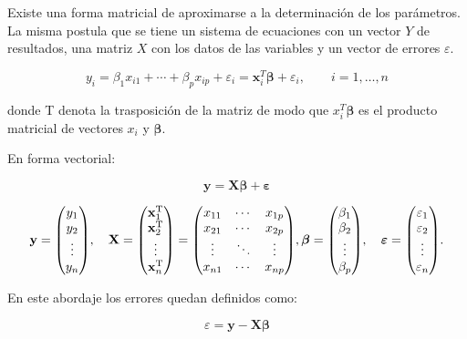 Existe una forma matricial de aproximarse a la determinación de los parámetros. La misma postula que se tiene un sistema de ecuaciones con un vector $Y$ de resultados, una matriz $X$ con los datos de las variables y un vector de errores $\varepsilon$. 

$$y_{i}=\beta _{1}x_{i1}+\cdots +\beta _{p}x_{ip}+\varepsilon _{i}=\mathbf {x} _{i}^{T}{\boldsymbol {\beta }}+\varepsilon _{i},\qquad i=1,\ldots,n$$

donde T denota la trasposición de la matriz de modo que ${x}_{i}^{T} \boldsymbol {\beta}$ es el producto matricial de vectores $x_i$ y $\boldsymbol {\beta }$.

En forma vectorial:

$$\mathbf {y} =\mathbf {X} {\boldsymbol {\beta }}+{\boldsymbol {\varepsilon }}$$


$$\mathbf {y} ={\begin{pmatrix}y_{1}\\y_{2}\\\vdots \\y_{n}\end{pmatrix}},\quad 
\mathbf {X} ={\begin{pmatrix}\mathbf {x} _{1}^{\rm {T}}\\\mathbf {x} _{2}^{\rm {T}}\\\vdots \\\mathbf {x} _{n}^{\rm {T}}\end{pmatrix}}={\begin{pmatrix}x_{11}&\cdots &x_{1p}\\x_{21}&\cdots &x_{2p}\\\vdots &\ddots &\vdots \\x_{n1}&\cdots &x_{np}\end{pmatrix}},
{\boldsymbol {\beta }}={\begin{pmatrix}\beta _{1}\\\beta _{2}\\\vdots \\\beta _{p}\end{pmatrix}},\quad {\boldsymbol {\varepsilon }}={\begin{pmatrix}\varepsilon _{1}\\\varepsilon _{2}\\\vdots \\\varepsilon _{n}\end{pmatrix}}.$$

En este abordaje los errores quedan definidos como: 

$$\varepsilon = \mathbf {y} - \mathbf {X} {\boldsymbol {\beta }}$$

